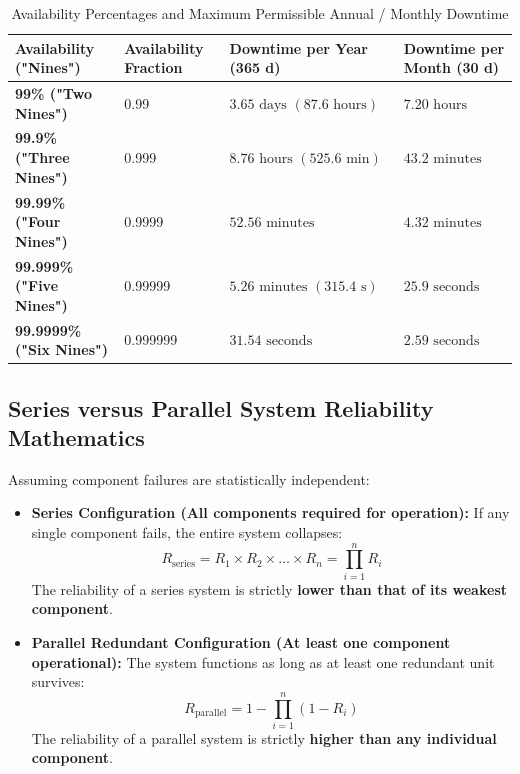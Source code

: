 \begin{table}[htbp]
\centering
\small
\caption{Availability Percentages and Maximum Permissible Annual / Monthly Downtime}
\label{tab:table_of_nines}
\begin{tabular}{l l l l}
\toprule
\textbf{Availability ("Nines")} & \textbf{Availability Fraction} & \textbf{Downtime per Year (365 d)} & \textbf{Downtime per Month (30 d)} \\
\midrule
\textbf{99\% ("Two Nines")} & 0.99 & $3.65\text{ days } (87.6\text{ hours})$ & $7.20\text{ hours}$ \\
\textbf{99.9\% ("Three Nines")} & 0.999 & $8.76\text{ hours } (525.6\text{ min})$ & $43.2\text{ minutes}$ \\
\textbf{99.99\% ("Four Nines")} & 0.9999 & $52.56\text{ minutes}$ & $4.32\text{ minutes}$ \\
\textbf{99.999\% ("Five Nines")} & 0.99999 & $5.26\text{ minutes } (315.4\text{ s})$ & $25.9\text{ seconds}$ \\
\textbf{99.9999\% ("Six Nines")} & 0.999999 & $31.54\text{ seconds}$ & $2.59\text{ seconds}$ \\
\bottomrule
\end{tabular}
\end{table}

\subsection{Series versus Parallel System Reliability Mathematics}
Assuming component failures are statistically independent:
\begin{itemize}
    \item \textbf{Series Configuration (All components required for operation):}
    If any single component fails, the entire system collapses:
    \begin{equation}
    \boxed{R_{\text{series}} = R_1 \times R_2 \times \dots \times R_n = \prod_{i=1}^{n} R_i}
    \end{equation}
    The reliability of a series system is strictly \textbf{lower than that of its weakest component}.
    \item \textbf{Parallel Redundant Configuration (At least one component operational):}
    The system functions as long as at least one redundant unit survives:
    \begin{equation}
    \boxed{R_{\text{parallel}} = 1 - \prod_{i=1}^{n} (1 - R_i)}
    \end{equation}
    The reliability of a parallel system is strictly \textbf{higher than any individual component}.
\end{itemize}

